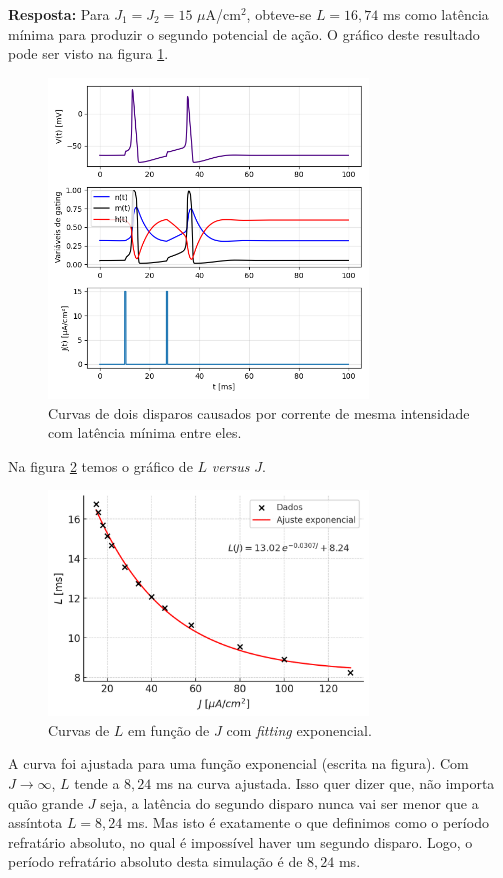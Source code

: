 \documentclass[english,11pt,a4paper]{article}
\begin{document}
	\noindent\textbf{Resposta:} Para $J_1 = J_2 = 15$ $\mu$A/cm$^2$, obteve-se $L = 16,74$ ms como latência mínima para produzir o segundo potencial de ação. O gráfico deste resultado pode ser visto na figura \ref{fig6}.
	
	\begin{figure}[H]
		\centering
		\includegraphics[width=8.5cm]{../figures/ex_6_1.png}
		\caption{Curvas de dois disparos causados por corrente de mesma intensidade com latência mínima entre eles.}
		\label{fig6}
	\end{figure}
	
	Na figura \ref{fig7} temos o gráfico de $L$ \textit{versus} $J$.
	
		\begin{figure}[H]
		\centering
		\includegraphics[width=8.5cm]{../figures/ex_6_2.png}
		\caption{Curvas de $L$ em função de $J$ com \textit{fitting} exponencial.}
		\label{fig7}
	\end{figure}
	
	A curva foi ajustada para uma função exponencial (escrita na figura). Com $J \rightarrow \infty$, $L$ tende a $8,24$ ms na curva ajustada. Isso quer dizer que, não importa quão grande $J$ seja, a latência do segundo disparo nunca vai ser menor que a assíntota $L = 8,24$ ms. Mas isto é exatamente o que definimos como o período refratário absoluto, no qual é impossível haver um segundo disparo. Logo, o período refratário absoluto desta simulação é de $8,24$ ms.\\\\
	
\end{document}
